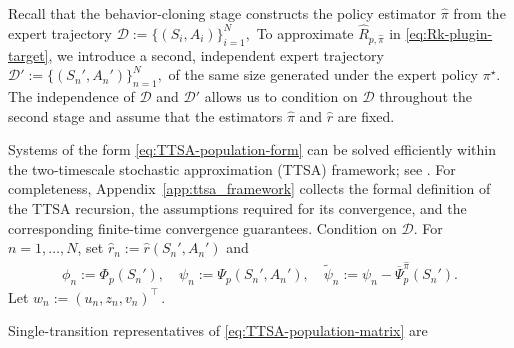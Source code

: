 \documentclass{article}
\theoremstyle{definition}
\theoremstyle{remark}
\theoremstyle{plain}
\def\eqsp{\,}
\newcommand{\dsieve}{p}
\numberwithin{equation}{section}
\begin{document}
Recall that the behavior-cloning stage constructs the policy estimator $\widehat\pi$ from the expert trajectory
\(
    \mathcal D:=\{(S_i,A_i)\}_{i=1}^{N},
\)
To approximate \(\widehat R_{\dsieve, \widehat \pi}\) in \eqref{eq:Rk-plugin-target}, we introduce a second, independent expert trajectory
\(
    \mathcal D'
    :=
    \{(S_n',A_n')\}_{n=1}^{N},
\) of the same size
generated under the expert policy $\pi^\star$. The independence of $\mathcal D$ and $\mathcal D'$ allows us to condition on $\mathcal D$ throughout the second stage and assume that the estimators $\widehat\pi$ and $\widehat r$ are fixed.


Systems of the form \eqref{eq:TTSA-population-form} can be solved efficiently within the two-timescale stochastic approximation (TTSA) framework; see \cite{butyrin2026gaussian}. For completeness, Appendix~\ref{app:ttsa_framework} collects the formal definition of the TTSA recursion, the assumptions required for its convergence, and the corresponding finite-time convergence guarantees.
Condition on \(\mathcal D\). For \(n=1,\ldots,N\), set \(\widehat r_n:=\widehat r(S_n',A_n')\) and 
\begin{align}
\label{eq:sample-features}
\phi_n:=\Phi_\dsieve(S_n'),
\quad
\psi_n:=\Psi_\dsieve(S_n',A_n'),
\quad
\widetilde\psi_n
    :=
    \psi_n-
\overline\Psi_\dsieve^{\widehat\pi}(S_n').
\end{align}
Let
\(
    w_n
    :=
    (
        u_n,z_n,v_n
    )^{\top}\eqsp.
\) 

Single-transition representatives of \eqref{eq:TTSA-population-matrix} are
\end{document}
